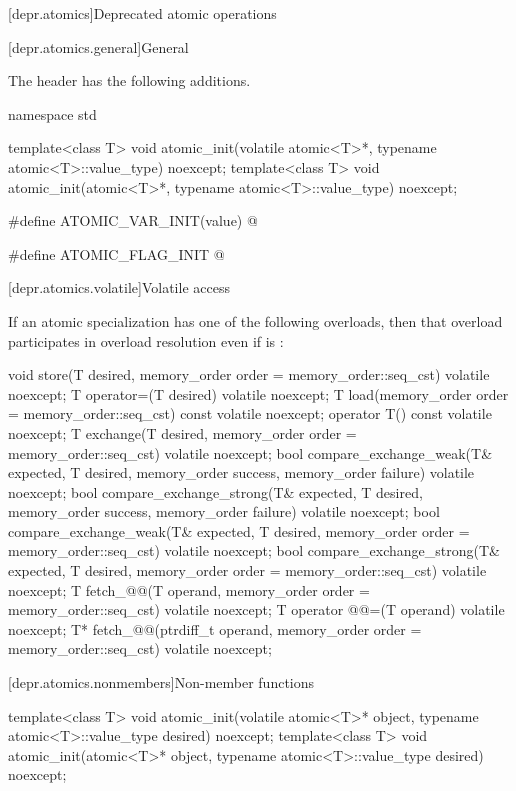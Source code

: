 [depr.atomics]{Deprecated atomic operations}

[depr.atomics.general]{General}

\pnum
The header  has the following additions.

\begin{codeblock}
namespace std {
  template<class T>
    void atomic_init(volatile atomic<T>*, typename atomic<T>::value_type) noexcept;
  template<class T>
    void atomic_init(atomic<T>*, typename atomic<T>::value_type) noexcept;

  #define ATOMIC_VAR_INIT(value) @\seebelow@

  #define ATOMIC_FLAG_INIT @\seebelow@
}
\end{codeblock}

[depr.atomics.volatile]{Volatile access}

\pnum
If an atomic specialization has one of the following overloads,
then that overload participates in overload resolution
even if  is :
\begin{codeblock}
void store(T desired, memory_order order = memory_order::seq_cst) volatile noexcept;
T operator=(T desired) volatile noexcept;
T load(memory_order order = memory_order::seq_cst) const volatile noexcept;
operator T() const volatile noexcept;
T exchange(T desired, memory_order order = memory_order::seq_cst) volatile noexcept;
bool compare_exchange_weak(T& expected, T desired,
                           memory_order success, memory_order failure) volatile noexcept;
bool compare_exchange_strong(T& expected, T desired,
                             memory_order success, memory_order failure) volatile noexcept;
bool compare_exchange_weak(T& expected, T desired,
                           memory_order order = memory_order::seq_cst) volatile noexcept;
bool compare_exchange_strong(T& expected, T desired,
                             memory_order order = memory_order::seq_cst) volatile noexcept;
T fetch_@@(T operand, memory_order order = memory_order::seq_cst) volatile noexcept;
T operator @@=(T operand) volatile noexcept;
T* fetch_@@(ptrdiff_t operand, memory_order order = memory_order::seq_cst) volatile noexcept;
\end{codeblock}

[depr.atomics.nonmembers]{Non-member functions}

%
\begin{itemdecl}
template<class T>
  void atomic_init(volatile atomic<T>* object, typename atomic<T>::value_type desired) noexcept;
template<class T>
  void atomic_init(atomic<T>* object, typename atomic<T>::value_type desired) noexcept;
\end{itemdecl}

